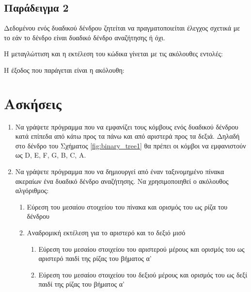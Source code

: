 \subsection{Παράδειγμα 2}

Δεδομένου ενός δυαδικού δένδρου ζητείται να πραγματοποιείται έλεγχος σχετικά με το εάν το δένδρο είναι δυαδικό δένδρο αναζήτησης ή όχι. 



Η μεταγλώττιση και η εκτέλεση του κώδικα γίνεται με τις ακόλουθες εντολές:



Η έξοδος που παράγεται είναι η ακόλουθη:



\section{Ασκήσεις}

\begin{enumerate}[nolistsep]
\item Να γράψετε πρόγραμμα που να εμφανίζει τους κόμβους ενός δυαδικού δένδρου κατά επίπεδα από κάτω προς τα πάνω και από αριστερά προς τα δεξιά. Δηλαδή στο δένδρο του Σχήματος \ref{fig:binary_tree1} θα πρέπει οι κόμβοι να εμφανιστούν ως D, E, F, G, B, C, A.
\item Να γράψετε πρόγραμμα που να δημιουργεί από έναν ταξινομημένο πίνακα ακεραίων ένα δυαδικό δένδρο αναζήτησης. Να χρησιμοποιηθεί ο ακόλουθος αλγόριθμος:
	\begin{enumerate}[nolistsep]
	\item Εύρεση του μεσαίου στοιχείου του πίνακα και ορισμός του ως ρίζα του δένδρου
	\item Αναδρομική εκτέλεση για το αριστερό και το δεξιό μισό
		\begin{enumerate}[nolistsep]
		\item Εύρεση του μεσαίου στοιχείου του αριστερού μέρους και ορισμός του ως 		αριστερό παιδί της ρίζας του βήματος α'
		\item Εύρεση του μεσαίου στοιχείου του δεξιού μέρους και ορισμός του ως δεξί παιδί της ρίζας του βήματος α'
		\end{enumerate}
	\end{enumerate}
\end{enumerate}

